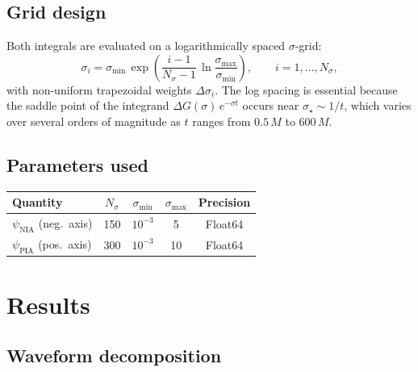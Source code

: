 \documentclass[12pt,a4paper]{article}
\begin{document}
\subsection{Grid design}

Both integrals are evaluated on a logarithmically spaced $\sigma$-grid:
\begin{equation}
  \sigma_i = \sigma_{\min}\,\exp\!\left(\frac{i-1}{N_\sigma - 1}\,
              \ln\frac{\sigma_{\max}}{\sigma_{\min}}\right),
  \qquad i = 1,\ldots,N_\sigma,
\end{equation}
with non-uniform trapezoidal weights $\Delta\sigma_i$.
The log spacing is essential because the saddle point of the integrand
$\Delta G(\sigma)\,e^{-\sigma t}$ occurs near $\sigma_\star \sim 1/t$,
which varies over several orders of magnitude as $t$ ranges from
$0.5\,M$ to $600\,M$.

\subsection{Parameters used}

\begin{center}
\begin{tabular}{lcccc}
\toprule
Quantity & $N_\sigma$ & $\sigma_{\min}$ & $\sigma_{\max}$ & Precision \\
\midrule
$\psi_{\mathrm{NIA}}$ (neg.\ axis) & 150 & $10^{-3}$ & 5 & Float64 \\
$\psi_{\mathrm{PIA}}$ (pos.\ axis) & 300 & $10^{-3}$ & 10 & Float64 \\
\bottomrule
\end{tabular}
\end{center}

\section{Results}

\subsection{Waveform decomposition}
\end{document}
